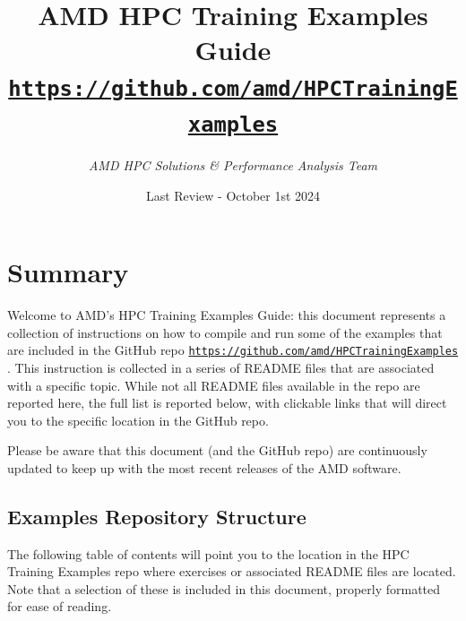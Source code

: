 \documentclass[
]{article}
\author{\it AMD HPC Solutions \& Performance Analysis Team }
\date{Last Review - October 1st 2024}
\title{\bf AMD HPC Training Examples Guide \\
      \large \href{https://github.com/amd/HPCTrainingExamples}
                  {\texttt{https://github.com/amd/HPCTrainingExamples}}}
\let\oldtexttt\texttt
\renewcommand{\texttt}[1]{
  \colorbox{Light}{\oldtexttt{#1}}
}
\begin{document}
\maketitle

{
\setcounter{tocdepth}{3}
\tableofcontents
}

\pagebreak
\hypertarget{amd-hpc-training-examples-repo}{%
\section{Summary}\label{amd-hpc-training-examples-repo}}

Welcome to AMD's HPC Training Examples Guide: this document represents a collection of instructions on how to compile and run some of the examples that are included in the GitHub repo \href{https://github.com/amd/HPCTrainingExamples}{\texttt{https://github.com/amd/HPCTrainingExamples}}. This instruction is collected in a series of README files that are associated with a specific topic. While not all README files available in the repo are reported here, the full list is reported below, with clickable links that will direct you to the specific location in the GitHub repo.

Please be aware that this document (and the GitHub repo) are continuously updated to keep up with the most recent releases of the AMD software.

\hypertarget{repository-structure}{%
\subsection{Examples Repository Structure}\label{repository-structure}}

The following table of contents will point you to the location in the HPC Training Examples repo where exercises or associated README files are located. Note that a selection of these is included in this document, properly formatted for ease of reading.
\end{document}
